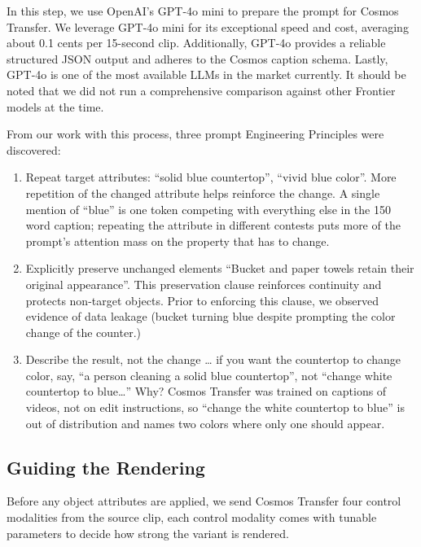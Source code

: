 \documentclass[runningheads]{llncs}
\begin{document}
In this step, we use OpenAI's GPT-4o mini \cite{r23} to prepare the prompt for Cosmos Transfer. We leverage GPT-4o mini for its exceptional speed and cost, averaging about 0.1 cents per 15-second clip. Additionally, GPT-4o provides a reliable structured JSON output and adheres to the Cosmos caption schema. Lastly, GPT-4o is one of the most available LLMs in the market currently. It should be noted that we did not run a comprehensive comparison against other Frontier models at the time.

From our work with this process, three prompt Engineering Principles were discovered:

\begin{enumerate}
\item Repeat target attributes: ``solid blue countertop'', ``vivid blue color''. More repetition of the changed attribute helps reinforce the change. A single mention of ``blue'' is one token competing with everything else in the 150 word caption; repeating the attribute in different contests puts more of the prompt's attention mass on the property that has to change.
\item Explicitly preserve unchanged elements ``Bucket and paper towels retain their original appearance''. This preservation clause reinforces continuity and protects non-target objects. Prior to enforcing this clause, we observed evidence of data leakage (bucket turning blue despite prompting the color change of the counter.)
\item Describe the result, not the change \ldots{} if you want the countertop to change color, say, ``a person cleaning a solid blue countertop'', not ``change white countertop to blue\ldots'' Why? Cosmos Transfer was trained on captions of videos, not on edit instructions, so ``change the white countertop to blue'' is out of distribution and names two colors where only one should appear.
\end{enumerate}

\subsection{Guiding the Rendering}

Before any object attributes are applied, we send Cosmos Transfer four control modalities from the source clip, each control modality comes with tunable parameters to decide how strong the variant is rendered.
\end{document}
